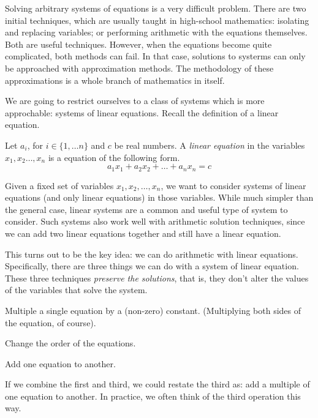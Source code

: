 \documentclass[fleqn]{report}
\begin{document}
Solving arbitrary systems of equations is a very difficult
problem. There are two initial techniques, which are usually
taught in high-school mathematics: isolating and replacing
variables; or performing arithmetic with the equations
themselves. Both are useful techniques. However, when the
equations become quite complicated, both methods can fail. In
that case, solutions to systerms can only be approached with
approximation methods. The methodology of these approximations is
a whole branch of mathematics in itself. 

We are going to restrict ourselves to a class of systems which
is more approchable: systems of linear equations. Recall the
definition of a linear equation.

\begin{defn}
Let $a_i$, for $i \in \{1, \ldots n\}$ and $c$ be real
numbers. A \emph{linear equation} in the variables $x_1, x_2
\ldots, x_n$ is a equation of the following form.
\begin{equation*}
a_1 x_1 + a_2 x_2 + \ldots + a_n x_n = c
\end{equation*}
\end{defn}

Given a fixed set of variables $x_1, x_2, \ldots, x_n$, we want
to consider systems of linear equations (and only linear
equations) in those variables. While much simpler than the
general case, linear systems are a common and useful type of system
to consider. Such systems also work well with arithmetic
solution techniques, since we can add two linear equations together
and still have a linear equation. 

This turns out to be the key idea: we can do arithmetic with
linear equations. Specifically, there are three things we can
do with a system of linear equation. These three techniques
\emph{preserve the solutions}, that is, they don't alter 
the values of the variables that solve the system.
\begin{smallitemize}
\item Multiple a single equation by a (non-zero) constant.
(Multiplying both sides of the equation, of course).
\item Change the order of the equations.
\item Add one equation to another.
\end{smallitemize}
If we combine the first and third, we could restate the third
as: add a multiple of one equation to another. In practice, we
often think of the third operation this way.
\end{document}
